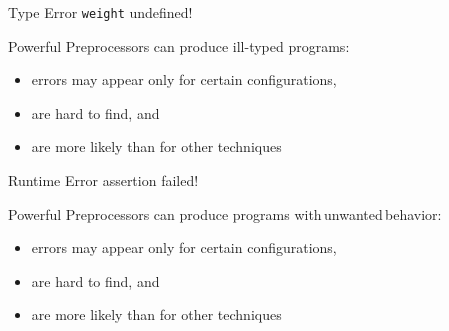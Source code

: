\begin{frame}{\myframetitle}
	\begin{mycolumns}[T,animation=none,widths={73}]
	\mynextcolumn
		\begin{example}{Type Error}
			\texttt{weight} undefined!
		\end{example}

		\pause
		\begin{note}{Powerful Preprocessors}
			\setlength\leftmargini{3mm}
			can produce ill-typed programs:
			\begin{itemize}
				\item errors may appear only for certain configurations,
				\item are hard to find, and
				\item are more likely than for other techniques
			\end{itemize}
			\lectureanalyses
		\end{note}
	\end{mycolumns}
\end{frame}

\begin{frame}{\myframetitle}
	\begin{mycolumns}[T,animation=none,widths={73}]
	\mynextcolumn
		\begin{example}{Runtime Error}
			assertion failed!
		\end{example}

		\pause
		\begin{note}{Powerful Preprocessors}
			\setlength\leftmargini{3mm}
			can produce programs with\,unwanted\,behavior:
			\begin{itemize}
				\item errors may appear only for certain configurations,
				\item are hard to find, and
				\item are more likely than for other techniques
			\end{itemize}
			\lecturetesting
		\end{note}
	\end{mycolumns}
\end{frame}



